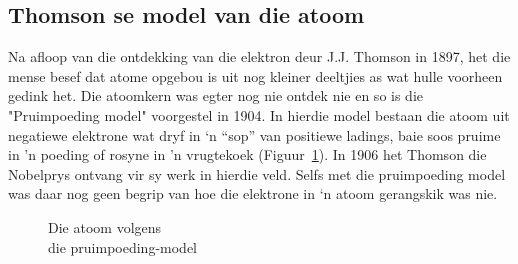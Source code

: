             \subsection*{Thomson se model van die atoom}
            \nopagebreak
\begin{minipage}{.5\textwidth}
        \label{m38756*id254616}
Na afloop van die ontdekking van die elektron deur J.J. Thomson in 1897, het die mense besef dat atome opgebou is uit nog kleiner deeltjies as wat hulle voorheen gedink het. Die atoomkern was egter nog nie ontdek nie en so is die "Pruimpoeding model" voorgestel in 1904. In hierdie model bestaan die atoom uit negatiewe elektrone wat dryf in ‘n “sop” van positiewe ladings, baie soos pruime in 'n poeding of rosyne in 'n vrugtekoek (Figuur~\ref{fig:atom:plumpudding}). In 1906 het Thomson die Nobelprys ontvang vir sy werk in hierdie veld. Selfs met die pruimpoeding model was daar nog geen begrip van hoe die elektrone in ‘n atoom gerangskik was nie.\\ 
\end{minipage}
\begin{minipage}{.5\textwidth}
    \setcounter{subfigure}{0}
	\begin{figure}[H] %
    \begin{center}
\begin{minipage}{.8\textwidth}
\caption{Die atoom volgens \\ die pruimpoeding-model}
\end{minipage}
\label{fig:atom:plumpudding}
\end{center}
 \end{figure}    
\end{minipage}   
